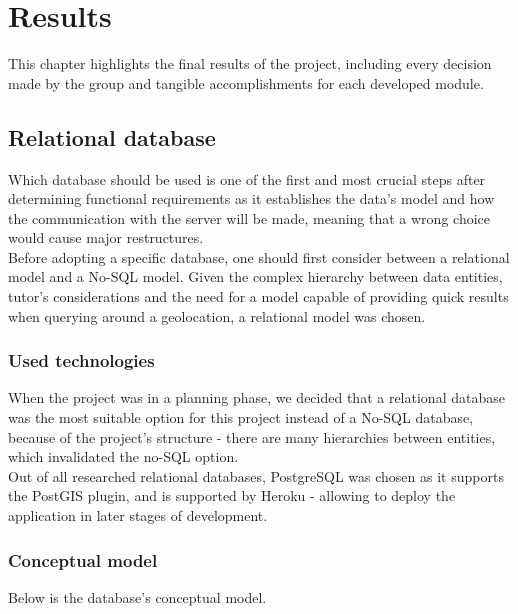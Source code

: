 %
%
\chapter{Results}

This chapter highlights the final results of the project,
including every decision made by the group and tangible accomplishments for each developed module.\\

\section{Relational database}

Which database should be used is one of the first and most
crucial steps after determining functional requirements 
as it establishes the data's model and how the communication
with the server will be made, meaning that a wrong choice
would cause major restructures.\\

Before adopting a specific database, one should first
consider between a relational model and a No-SQL model. 
Given the complex hierarchy between data entities,
tutor's considerations and the need for a model capable of 
providing quick results when querying around a geolocation, 
a relational model was chosen.

\subsection{Used technologies}

When the project was in a planning phase, we decided that a relational database was the most suitable option for this project
instead of a No-SQL database, because of the project's structure - there are many hierarchies between entities, which invalidated the
no-SQL option.\\

Out of all researched relational databases, 
PostgreSQL was chosen as it supports the PostGIS\cite{postGIS} plugin, and 
is supported by Heroku - allowing to 
deploy the application in later stages of development.\\

\subsection{Conceptual model}
Below is the database's conceptual model.


